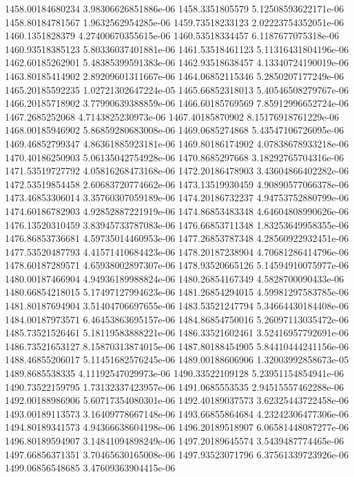 {1458.00184680234 3.98306626851886e-06
1458.3351805579 5.12508593622171e-06
1458.80184781567 1.9632562954285e-06
1459.73518233123 2.02223754352051e-06
1460.1351828379 4.27400670355615e-06
1460.53518334457 6.1187677075318e-06
1460.93518385123 5.80336037401881e-06
1461.53518461123 5.11316431804196e-06
1462.60185262901 5.48385399591383e-06
1462.93518638457 4.13340724190019e-06
1463.80185414902 2.89209601311667e-06
1464.06852115346 5.2850207177249e-06
1465.20185592235 1.02721302647224e-05
1465.66852318013 5.40546508279767e-06
1466.20185718902 3.77990639388859e-06
1466.60185769569 7.85912996652724e-06
1467.2685252068 4.7143825230973e-06
1467.40185870902 8.15176918761229e-06
1468.00185946902 5.86859280683008e-06
1469.0685274868 5.43547106726095e-06
1469.46852799347 4.86361885923181e-06
1469.80186174902 4.07838678933218e-06
1470.40186250903 5.06135042754928e-06
1470.8685297668 3.18292765704316e-06
1471.53519727792 4.05816268473168e-06
1472.20186478903 3.43604866402282e-06
1472.53519854458 2.60683720774662e-06
1473.13519930459 4.90890577066378e-06
1473.46853306014 3.35760307059189e-06
1474.20186732237 4.94753752880799e-06
1474.60186782903 4.92852887221919e-06
1474.86853483348 4.64604808990626e-06
1476.13520310459 3.83945733787083e-06
1476.66853711348 1.83253649958355e-06
1476.86853736681 4.59735014460953e-06
1477.26853787348 4.28560922932451e-06
1477.53520487793 4.41571410684423e-06
1478.20187238904 4.70681286414796e-06
1478.60187289571 4.65938002897307e-06
1478.93520665126 5.14594910075977e-06
1480.00187466904 4.94936189988824e-06
1480.26854167349 4.5828700090433e-06
1480.66854218015 5.17497127994623e-06
1481.26854294015 4.59981297583785e-06
1481.80187694904 3.51404706697655e-06
1483.53521247794 5.34664430184408e-06
1484.00187973571 6.46453863695157e-06
1484.86854750016 5.26097113035472e-06
1485.73521526461 5.18119583888221e-06
1486.33521602461 3.52416957792691e-06
1486.73521653127 8.15870313874015e-06
1487.80188454905 5.84410444241156e-06
1488.46855206017 5.11451682576245e-06
1489.00188606906 1.32003992858673e-05
1489.8685538335 4.11192547029973e-06
1490.33522109128 5.23951154854941e-06
1490.73522159795 1.73132337423957e-06
1491.0685553535 2.94515557462288e-06
1492.00188986906 5.60717354080301e-06
1492.40189037573 3.62325443722458e-06
1493.00189113573 3.16409778667148e-06
1493.66855864684 4.23242306477306e-06
1494.80189341573 4.94366638604198e-06
1496.20189518907 6.06581448087277e-06
1496.80189594907 3.14841094898249e-06
1497.20189645574 3.5439487774465e-06
1497.66856371351 3.70465630165008e-06
1497.93523071796 6.37561339723926e-06
1499.06856548685 3.47609363904415e-06
}
